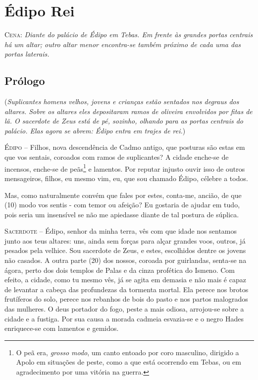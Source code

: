 \clearpage

\chapter{Édipo Rei}

\parindent0pt

\parskip2pt

\textsc{Cena:} \emph{Diante do palácio de Édipo em Tebas. Em frente às grandes
portas centrais há um altar; outro altar menor encontra-se também
próximo de cada uma das portas laterais.}
\bigskip


\section{Prólogo}

(\emph{Suplicantes  homens velhos, jovens e crianças  estão sentados
nos degraus dos altares. Sobre os altares eles depositaram ramos de
oliveira envolvidos por fitas de lã. O sacerdote de Zeus está de pé,
sozinho, olhando para as portas centrais do palácio. Elas agora se
abrem: Édipo entra em trajes de rei.})
\bigskip

\textsc{Édipo} --   Filhos, nova descendência de Cadmo antigo, que posturas são estas em que
vos sentais, coroados com ramos de suplicantes? A cidade enche-se de
incensos, enche-se de peãs\footnote{O peã era, \emph{grosso modo}, um 
canto entoado por coro masculino, dirigido a Apolo em situações de 
peste, como a que está ocorrendo em Tebas, ou em agradecimento por uma 
vitória na guerra.} e lamentos. Por reputar injusto ouvir isso de 
outros mensageiros, filhos, eu mesmo vim, eu, que sou chamado Édipo, 
célebre a todos.

Mas, como naturalmente convém que fales por estes, conta-me, ancião, de
que (10) modo vos sentis - com temor ou afeição? Eu gostaria de ajudar
em tudo, pois seria um insensível se não me apiedasse diante de tal
postura de súplica.

\textsc{Sacerdote} --   Édipo, senhor da minha terra, vês com que idade nos sentamos junto aos
teus altares: uns, ainda sem forças para alçar grandes voos, outros, já
pesados pela velhice. Sou sacerdote de Zeus, e estes, escolhidos dentre
os jovens não casados. A outra parte (20) dos nossos, coroada por
guirlandas, senta-se na ágora, perto dos dois templos de Palas e da
cinza profética do Ismeno. Com efeito, a cidade, como tu mesmo vês, já
se agita em demasia e não mais é capaz de levantar a cabeça das
profundezas da tormenta mortal. Ela perece nos brotos frutíferos do
solo, perece nos rebanhos de bois do pasto e nos partos malogrados das
mulheres. O deus portador do fogo, peste a mais odiosa, arrojou-se sobre
a cidade e a fustiga. Por sua causa a morada cadmeia esvazia-se e o
negro Hades enriquece-se com lamentos e gemidos.

